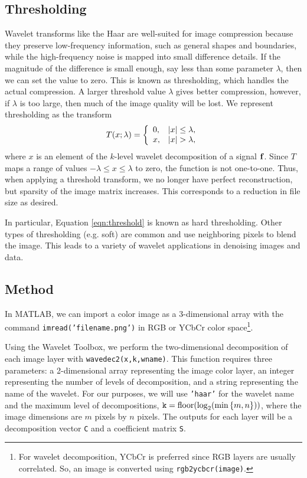 \documentclass[12pt]{article}
\DeclareMathOperator{\floor}{floor}
\theoremstyle{definition}
\renewenvironment{cases}{
  \left\{
    \begin{array}{ll}
}{
    \end{array}
  \right.
}
\begin{document}
  \subsection{Thresholding}
  Wavelet transforms like the Haar are well-suited for image compression because they preserve low-frequency information, such as general shapes and boundaries, while the high-frequency noise is mapped into small difference details. If the magnitude of the difference is small enough, say less than some parameter \(\lambda\), then we can set the value to zero. This is known as thresholding, which handles the actual compression. A larger threshold value \(\lambda\) gives better compression, however, if \(\lambda\) is too large, then much of the image quality will be lost.
  We represent thresholding as the transform
  \begin{equation} \label{eqn:threshold}
    T(x;\lambda) = \begin{cases}
      0, & |x| \leq \lambda,\\
      x, & |x| > \lambda,
    \end{cases}
  \end{equation}
  where \(x\) is an element of the \(k\)-level wavelet decomposition of a signal \(\vb{f}\). Since \(T\) maps a range of values \(- \lambda \leq x \leq \lambda\) to zero, the function is not one-to-one. Thus, when applying a threshold transform, we no longer have perfect reconstruction, but sparsity of the image matrix increases. This corresponds to a reduction in file size as desired.

  In particular, Equation \eqref{eqn:threshold} is known as hard thresholding. Other types of thresholding (e.g. soft) are common and use neighboring pixels to blend the image. This leads to a variety of wavelet applications in denoising images and data.

  \subsection{Method}
  In MATLAB, we can import a color image as a 3-dimensional array with the command \texttt{imread('filename.png')} in RGB or YCbCr color space\footnote{For wavelet decomposition, YCbCr is preferred since RGB layers are usually correlated. So, an image is converted using \texttt{rgb2ycbcr(image)}.}.
  
  Using the Wavelet Toolbox, we perform the two-dimensional decomposition of each image layer with \texttt{wavedec2(x,k,wname)}. This function requires three parameters: a 2-dimensional array representing the image color layer, an integer representing the number of levels of decomposition, and a string representing the name of the wavelet. For our purposes, we will use \texttt{'haar'} for the wavelet name and the maximum level of decompositions, \(\texttt{k} = \floor(\log_2(\min\qty{m,n}))\), where the image dimensions are \(m\) pixels by \(n\) pixels. The outputs for each layer will be a decomposition vector \texttt{C} and a coefficient matrix \texttt{S}.
\end{document}
